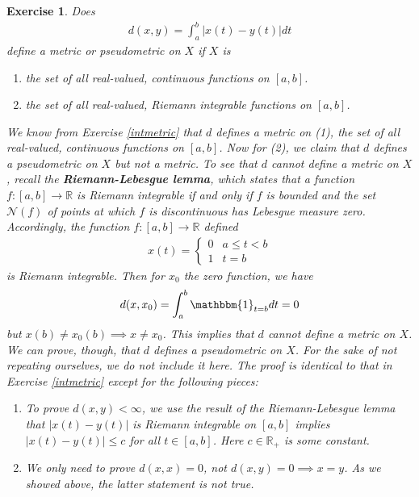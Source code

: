 \documentclass[11pt]{article}
\theoremstyle{mystyle}
\newtheorem{protoexer}{Exercise}[section]
\newenvironment{exer}
{\colorlet{shadecolor}{blue!15}\begin{shaded}\begin{protoexer}}
{\end{protoexer}\end{shaded}}
\begin{document}
\begin{exer}
Does
\begin{align*}
    d(x, y) = \int_a^b |x(t) - y(t)|dt
\end{align*}
define a metric or pseudometric on $X$ if $X$ is 
\begin{enumerate}
    \item the set of all real-valued, continuous functions on $[a,b]$.
    \item the set of all real-valued, Riemann integrable functions on $[a,b]$.
\end{enumerate}
We know from Exercise \ref{intmetric} that $d$ defines a metric on (1), the set of all real-valued, continuous functions on $[a,b]$. Now for (2), we claim that $d$ defines a pseudometric on $X$ but not a metric.\newline
To see that $d$ cannot define a metric on $X$, recall the \textbf{Riemann-Lebesgue lemma}, which states that a function $f: [a,b] \longrightarrow \mathbb{R}$ is Riemann integrable if and only if $f$ is bounded and the set $\mathcal{N}(f)$ of points at which $f$ is discontinuous has Lebesgue measure zero. Accordingly, the function $f: [a, b] \longrightarrow \mathbb{R}$ defined
\begin{align*}
    x(t) = \begin{cases}
    0 & a \leq t < b\\
    1 & t = b
    \end{cases}
\end{align*}
is Riemann integrable. Then for $x_0$ the zero function, we have 
\begin{align*}
    d(x, x_0) = \int_a^b \mathbbm{1}_{t = b} dt = 0
\end{align*}
but $x(b) \neq x_0(b) \implies x \neq x_0$. This implies that $d$ cannot define a metric on $X$.\newline
We can prove, though, that $d$ defines a pseudometric on $X$. For the sake of not repeating ourselves, we do not include it here. The proof is identical to that in Exercise \ref{intmetric} except for the following pieces:
\begin{enumerate}
    \item To prove $d(x, y) < \infty$, we use the result of the Riemann-Lebesgue lemma that $|x(t) - y(t)|$ is Riemann integrable on $[a,b]$ implies $|x(t) - y(t)| \leq c$ for all $t \in [a, b]$. Here $c \in \mathbb{R}_+$ is some constant.
    \item We only need to prove $d(x, x) = 0$, not $d(x, y) = 0 \implies x = y$. As we showed above, the latter statement is not true.
\end{enumerate}
\end{exer}
\end{document}
